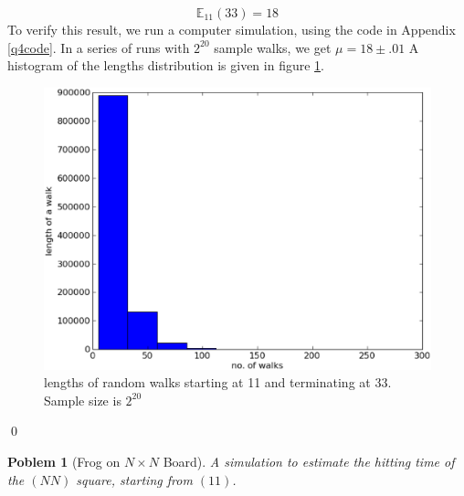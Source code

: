 \documentclass[8pt,notitlepage,twocolumn]{report}
\newtheorem{problem}{Poblem}
\newenvironment{solution}[1][Solution]{\begin{trivlist}
    \item[\hskip \labelsep {\bfseries #1}]}{\end{trivlist}}
\begin{document}
\begin{solution}
$$ \mathbb{E}_{11}(33) = 18 $$
To verify this result, we run a computer simulation, using the code in Appendix \ref{q4code}.
In a series of runs with $2^{20}$ sample walks, we get $ \mu = 18 \pm .01 $
A histogram of the lengths distribution is given in figure \ref{qn4afig}. 
\begin{figure}[h]
 \includegraphics[height=.30\textheight]{hw2q4f1.eps}
 \caption{	lengths of random walks starting at 11 and terminating at 33. Sample size is $2^{20}$
   \label{qn4afig}
  }
\end{figure}
\qed
\end{solution}

\begin{problem}[Frog on $N\times N$ Board]
A simulation to estimate the hitting time of the $(NN)$ square, starting from $(11)$.
\end{problem}
\end{document}
